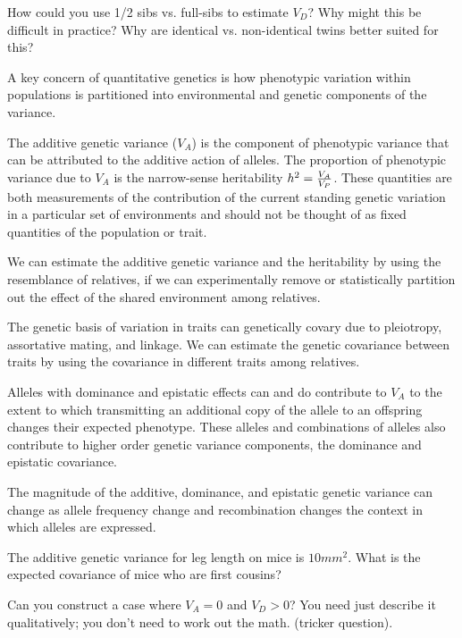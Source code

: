 \begin{question}{}
How could you use 1/2 sibs vs. full-sibs to estimate $V_D$? Why might
this be difficult in practice? Why are identical vs. non-identical
twins better suited for this? 
\end{question}

\begin{ChapterSummary}
  \item A key concern of quantitative genetics is how phenotypic variation within
    populations is  partitioned into environmental and genetic
    components of the variance.
  \item The additive genetic variance ($V_A$) is the component of phenotypic
    variance that can be attributed to the additive action of
    alleles.  The proportion of phenotypic variance due to $V_A$ is the narrow-sense
    heritability $h^2 = \nicefrac{V_A}{V_P}$. These quantities are both
    measurements of the contribution of the current standing genetic variation in a
    particular set of environments and should not be thought of as
    fixed quantities of the population or trait. 
  \item We can estimate the additive genetic variance and the
    heritability by using the resemblance of relatives, if we can
    experimentally remove or statistically partition out the effect of the shared environment among relatives. 
  \item The genetic basis of variation in traits can genetically covary due to pleiotropy, assortative
    mating, and linkage. We can estimate the genetic covariance
    between traits by using the covariance in different traits among
    relatives.
  \item Alleles with dominance and epistatic effects can
    and do contribute to $V_A$ to the extent to which transmitting
    an additional copy of the allele to an offspring changes their
    expected phenotype. These alleles and combinations of alleles also contribute to higher order
    genetic variance components, the dominance and epistatic
    covariance.
  \item The magnitude of the additive, dominance, and epistatic genetic variance can
    change as allele frequency change and recombination changes the
    context in which alleles are expressed. 
\end{ChapterSummary}
  
\begin{question}{}
The additive genetic variance for leg length on mice is $10mm^2$. What
is the expected covariance of mice who are first cousins?
\end{question}
\begin{question}{}
Can you construct a case where $V_A=0$ and $V_D>0$? You need
just describe it qualitatively; you don't need to work out the
math. (tricker question). %
\end{question}

